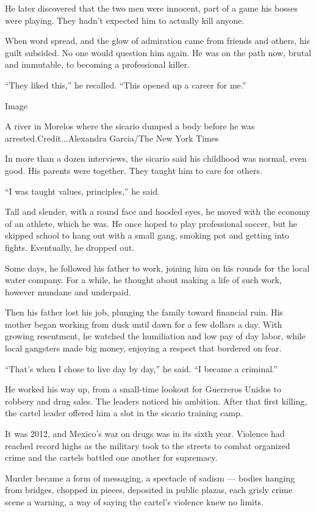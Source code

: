 He later discovered that the two men were innocent, part of a game his
bosses were playing. They hadn't expected him to actually kill anyone.

When word spread, and the glow of admiration came from friends and
others, his guilt subsided. No one would question him again. He was on
the path now, brutal and immutable, to becoming a professional killer.

``They liked this,'' he recalled. ``This opened up a career for me.''

Image

A river in Morelos where the sicario dumped a body before he was
arrested.Credit...Alexandra Garcia/The New York Times

In more than a dozen interviews, the sicario said his childhood was
normal, even good. His parents were together. They taught him to care
for others.

``I was taught values, principles,'' he said.

Tall and slender, with a round face and hooded eyes, he moved with the
economy of an athlete, which he was. He once hoped to play professional
soccer, but he skipped school to hang out with a small gang, smoking pot
and getting into fights. Eventually, he dropped out.

Some days, he followed his father to work, joining him on his rounds for
the local water company. For a while, he thought about making a life of
such work, however mundane and underpaid.

Then his father lost his job, plunging the family toward financial ruin.
His mother began working from dusk until dawn for a few dollars a day.
With growing resentment, he watched the humiliation and low pay of day
labor, while local gangsters made big money, enjoying a respect that
bordered on fear.

``That's when I chose to live day by day,'' he said. ``I became a
criminal.''

He worked his way up, from a small-time lookout for Guerreros Unidos to
robbery and drug sales. The leaders noticed his ambition. After that
first killing, the cartel leader offered him a slot in the sicario
training camp.

It was 2012, and Mexico's war on drugs was in its sixth year. Violence
had reached record highs as the military took to the streets to combat
organized crime and the cartels battled one another for supremacy.

Murder became a form of messaging, a spectacle of sadism --- bodies
hanging from bridges, chopped in pieces, deposited in public plazas,
each grisly crime scene a warning, a way of saying the cartel's violence
knew no limits.

